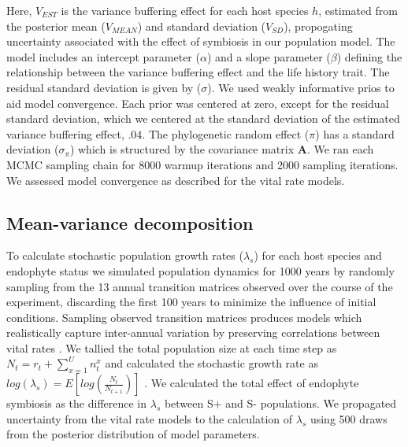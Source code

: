 \documentclass[9pt,twocolumn,twoside]{pnas-new}
\begin{document}
{Here, $V_{EST}$ is the variance buffering effect for each host species $h$, estimated from the posterior mean ($V_{MEAN}$) and standard deviation ($V_{SD}$), propogating uncertainty associated with the effect of symbiosis in our population model.
The model includes an intercept parameter ($\alpha$) and a slope parameter ($\beta$) defining the relationship between the variance buffering effect and the life history trait. 
The residual standard deviation is given by ($\sigma$). 
We used weakly informative prios to aid model convergence.
Each prior was centered at zero, except for the residual standard deviation, which we centered at the standard deviation of the estimated variance buffering effect, $.04$.
The phylogenetic random effect ($\pi$) has a standard deviation ($\sigma_{\pi}$) which is structured by the covariance matrix \textbf{A}.
We ran each MCMC sampling chain for 8000 warmup iterations and 2000 sampling iterations. 
We assessed model convergence as described for the vital rate models.

\subsection*{Mean-variance decomposition}
To calculate stochastic population growth rates ($\lambda_s$) for each host species and endophyte status we simulated population dynamics for 1000 years by randomly sampling from the 13 annual transition matrices observed over the course of the experiment, discarding the first 100 years to minimize the influence of initial conditions. 
Sampling observed transition matrices produces models which realistically capture inter-annual variation by preserving correlations between vital rates \cite{metcalf2015statistical}.
We tallied the total population size at each time step as  $N_{t} = r_{t} + \sum_{x=1}^{U}n^x_{t}$ and calculated the stochastic growth rate as $log(\lambda_s) = E[log(\frac{N_{t}}{N_{t+1}})]$ \cite{caswell2001matrix,rees2009integral}.
We calculated the total effect of endophyte symbiosis as the difference in $\lambda_s$ between S+ and S- populations. 
We propagated uncertainty from the vital rate models to the calculation of $\lambda_s$ using 500 draws from the posterior distribution of model parameters. 

}
\end{document}
